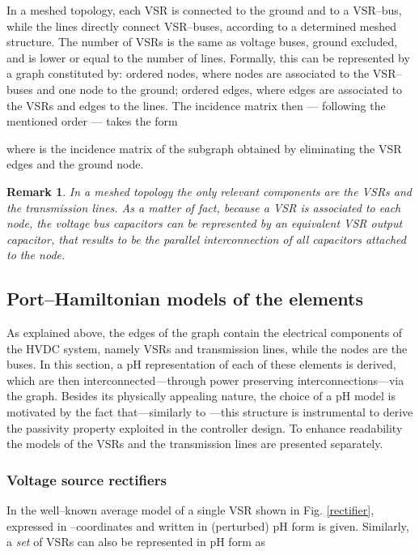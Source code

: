 \documentclass[5p,twocolumn]{elsarticle}
\newtheorem{remark}[theorem]{Remark}
\numberwithin{equation}{section}
\begin{document}
In a {meshed} topology, each VSR is connected to the {ground} and to a {VSR--bus}, while the lines directly connect {VSR--buses}, according to a determined meshed structure. The
number  of VSRs is the same as voltage buses, {ground} excluded, and is lower or equal to the number  of lines. Formally, this can be represented by a graph  constituted by:  ordered nodes, where  nodes are associated to the {VSR--buses} and one node to the {ground};  ordered edges, where 
edges are associated to the VSRs and  edges to the lines. The incidence matrix then --- following the mentioned order --- takes the form

where  is the incidence matrix of the subgraph obtained by eliminating the VSR edges and the ground node.
\begin{remark}\em
\label{parallel}
In a {meshed} topology the only relevant components are the VSRs and the  transmission lines. As a matter of fact, because a VSR is associated to each node, the voltage bus capacitors
can be represented by an equivalent VSR output capacitor, that results to be the parallel interconnection of all capacitors attached to the node.
\end{remark}
\subsection{Port--Hamiltonian models of the elements}
As explained above, the edges of the graph  contain the electrical components of the HVDC system, namely  VSRs and   transmission lines, while the nodes are the buses. In this section,
a pH representation of each of these elements is derived, which are then interconnected---through power preserving interconnections---via the graph. Besides its physically appealing nature, the choice of a pH model is
motivated by the fact that---similarly to \cite{HERetal}---this structure is instrumental to derive the passivity property exploited in the controller design. To enhance readability the models of the VSRs and
the transmission lines are presented separately.
\subsubsection{Voltage source rectifiers}
In \cite{ESCVANORT,HERetal,ECCZonetti} the well--known average model of a single VSR shown in Fig. \ref{rectifier}, expressed in --coordinates and written in (perturbed) pH form is given. Similarly, a {\em set} of  VSRs can also be represented in pH form as
\end{document}
